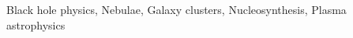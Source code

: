 \documentclass[twocolumn]{aastex631}
\begin{document}
Black hole physics, Nebulae, Galaxy clusters, Nucleosynthesis, Plasma astrophysics
\end{document}
